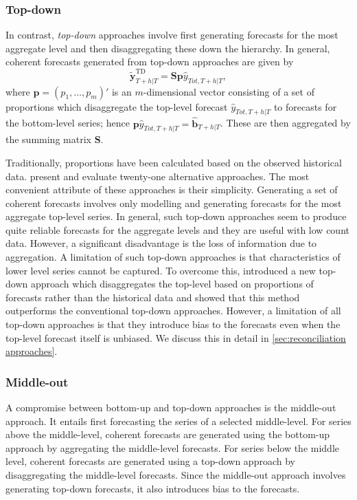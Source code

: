 \documentclass[graybox]{svmult}
\begin{document}
\subsubsection{Top-down}

In contrast, \textit{top-down} approaches involve first generating forecasts for the most aggregate level and then disaggregating these down the hierarchy. In general, coherent forecasts generated from top-down approaches are given by
\begin{equation*}
	\tilde{\bm{y}}^{\text{TD}}_{T+h|T}=\bm{S}\bm{p}\hat{y}_{Tot, T+h|T},
\end{equation*}
where $\bm{p} = (p_1,\dots,p_m)'$ is an $m$-dimensional vector consisting of a set of proportions which disaggregate the top-level forecast $\hat{y}_{Tot, T+h|T}$ to forecasts for the bottom-level series; hence $\bm{p}\hat{y}_{Tot, T+h|T}=\bm{\hat{\bm{b}}}_{T+h|T}$. These are then aggregated by the summing matrix $\bm{S}$.

Traditionally, proportions have been calculated based on the observed historical data. \citet{gross1990} present and evaluate twenty-one alternative approaches. The most convenient attribute of these approaches is their simplicity. Generating a set of coherent forecasts involves only modelling and generating forecasts for the most aggregate top-level series. In general, such top-down approaches seem to produce quite reliable forecasts for the aggregate levels and they are useful with low count data. However, a significant disadvantage is the loss of information due to aggregation. A limitation of such top-down approaches is that characteristics of lower level series cannot be captured. To overcome this, \citet{AthEtAl2009} introduced a new top-down approach which disaggregates the top-level based on proportions of forecasts rather than the historical data and showed that this method outperforms the conventional top-down approaches. However, a limitation of all top-down approaches is that they introduce bias to the forecasts even when the top-level forecast itself is unbiased. We discuss this in detail in \autoref{sec:reconciliation approaches}.

\subsubsection{Middle-out}

A compromise between bottom-up and top-down approaches is the middle-out approach. It entails first forecasting the series of a selected middle-level. For series above the middle-level, coherent forecasts are generated using the bottom-up approach by aggregating the middle-level forecasts. For series below the middle level, coherent forecasts are generated using a top-down approach by disaggregating the middle-level forecasts. Since the middle-out approach involves generating top-down forecasts, it also introduces bias to the forecasts.
\end{document}
